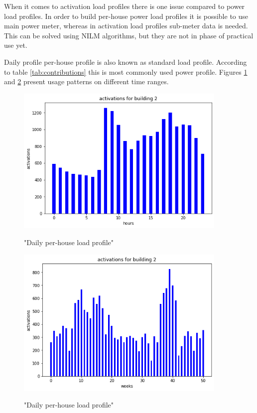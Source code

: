 When it comes to activation load profiles there is one issue compared to power load profiles.
In order to build per-house power load profiles it is possible to use main power meter, whereas in activation load profiles sub-meter data is needed.
This can be solved using NILM algorithms, but they are not in phase of practical use yet.

Daily profile per-house profile is also known as standard load profile. 
According to table \ref{tab:contributions} this is most commonly used power profile.
Figures \ref{fig:SLPdaily2} and \ref{fig:SLPyearly2} present usage patterns on different time ranges. 

\begin{figure}[H]
	\centering
	\caption{"Daily per-house load profile"}
	\includegraphics[width=0.9\textwidth]{../Figures/LPS/SLPdaily2.png}
	\label{fig:SLPdaily2}
\end{figure}

\begin{figure}[H]
	\centering
	\caption{"Daily per-house load profile"}
	\includegraphics[width=0.9\textwidth]{../Figures/LPS/SLPyearly2.png}
	\label{fig:SLPyearly2}
\end{figure}

